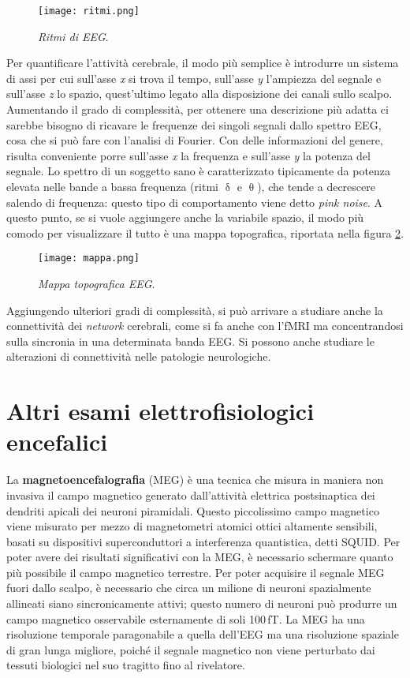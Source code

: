 \documentclass{report}
\newcommand{\figref}[1]{figura \ref{#1}}
\numberwithin{equation}{section}
\numberwithin{figure}{section}
\begin{document}
\begin{figure}[htp]
    \centering
    \texttt{[image: ritmi.png]}
    \caption{\label{fig:ritmi} \textit{Ritmi di EEG}.}
\end{figure}

Per quantificare l'attività cerebrale, il modo più semplice è introdurre un sistema di assi per cui sull'asse \textit{x} si trova il tempo, sull'asse \textit{y} l'ampiezza del segnale e sull'asse \textit{z} lo spazio, quest'ultimo legato alla disposizione dei canali sullo scalpo. Aumentando il grado di complessità, per ottenere una descrizione più adatta ci sarebbe bisogno di ricavare le frequenze dei singoli segnali dallo spettro EEG, cosa che si può fare con l'analisi di Fourier. Con delle informazioni del genere, risulta conveniente porre sull'asse \textit{x} la frequenza e sull'asse \textit{y} la potenza del segnale. Lo spettro di un soggetto sano è caratterizzato tipicamente da potenza elevata nelle bande a bassa frequenza (ritmi $\updelta$ e $\uptheta$), che tende a decrescere salendo di frequenza: questo tipo di comportamento viene detto \textit{pink noise}. A questo punto, se si vuole aggiungere anche la variabile spazio, il modo più comodo per visualizzare il tutto è una mappa topografica, riportata nella \figref{fig:mappa}.

\begin{figure}[htp]
    \centering
    \texttt{[image: mappa.png]}
    \caption{\label{fig:mappa} \textit{Mappa topografica EEG}.}
\end{figure}

\noindent Aggiungendo ulteriori gradi di complessità, si può arrivare a studiare anche la connettività dei \textit{network} cerebrali, come si fa anche con l'fMRI ma concentrandosi sulla sincronia in una determinata banda EEG. Si possono anche studiare le alterazioni di connettività nelle patologie neurologiche.

\section{Altri esami elettrofisiologici encefalici}
La \textbf{magnetoencefalografia} (MEG) è una tecnica che misura in maniera non invasiva il campo magnetico generato dall'attività elettrica postsinaptica dei dendriti apicali dei neuroni piramidali. Questo piccolissimo campo magnetico viene misurato per mezzo di magnetometri atomici ottici altamente sensibili, basati su dispositivi superconduttori a interferenza quantistica, detti SQUID. Per poter avere dei risultati significativi con la MEG, è necessario schermare quanto più possibile il campo magnetico terrestre. Per poter acquisire il segnale MEG fuori dallo scalpo, è necessario che circa un milione di neuroni spazialmente allineati siano sincronicamente attivi; questo numero di neuroni può produrre un campo magnetico osservabile esternamente di soli 100\,fT. La MEG ha una risoluzione temporale paragonabile a quella dell'EEG ma una risoluzione spaziale di gran lunga migliore, poiché il segnale magnetico non viene perturbato dai tessuti biologici nel suo tragitto fino al rivelatore.
\end{document}
